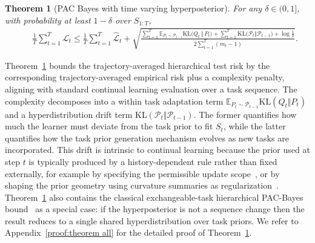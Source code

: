 \documentclass[10pt]{article} %
\newtheorem{theorem}{Theorem}
\begin{document}
\begin{theorem}[PAC Bayes with time varying hyperposterior]
\label{thm:pathwise_pac}
For any $\delta\in(0,1]$, with probability at least $1-\delta$ over $S_{1:T}$,
{%
\begin{equation*}
\begin{aligned} 
&\quad\frac{1}{T} \sum_{t=1}^T \mathcal L_t
\le  
\frac{1}{T} \sum_{t=1}^T \hat{\mathcal L}_t  + 
\sqrt{
\frac{
\displaystyle
\sum_{t=1}^T
\mathbb E_{P_t\sim\mathcal P_{t-1}}
\mathrm{KL}\bigl(Q_t \,\Vert\, P_t\bigr)
+
\sum_{t=1}^T
\mathrm{KL}\bigl(\mathcal P_t\Vert\mathcal P_{t-1}\bigr)
+
\log\frac{1}{\delta}}
{2\displaystyle\sum_{t=1}^T (m_t - 1)}
}.
\end{aligned}
\end{equation*}
}
\end{theorem}

Theorem~\ref{thm:pathwise_pac} bounds the trajectory-averaged hierarchical test risk by the corresponding trajectory-averaged empirical risk plus a complexity penalty, aligning with standard continual learning evaluation over a task sequence.
The complexity decomposes into a within task adaptation term $\mathbb E_{P_t\sim\mathcal P_{t-1}}\mathrm{KL}(Q_t\Vert P_t)$ and a hyperdistribution drift term $\mathrm{KL}(\mathcal P_t\Vert\mathcal P_{t-1})$. The former quantifies how much the learner must deviate from the task prior to fit $S_t$, while the latter quantifies how the task prior generation mechanism evolves as new tasks are incorporated.
This drift is intrinsic to continual learning because the prior used at step $t$ is typically produced by a history-dependent rule rather than fixed externally,
for example by specifying the permissible update scope~\citep{HAT2018,Supermasks2020,hu2022lora}, or by shaping the prior geometry using curvature summaries as regularization~\citep{EWC2017,SI2017}.
Theorem~\ref{thm:pathwise_pac} also contains the classical exchangeable-task hierarchical PAC-Bayes bound~\citep{pentinaPACBayesianBoundLifelong2014} as a special case: if the hyperposterior is not a sequence change then the result reduces to a single shared hyperdistribution over task priors. We refer to Appendix~\ref{proof:theorem all} for the detailed proof of Theorem~\ref{thm:pathwise_pac}.
\end{document}
